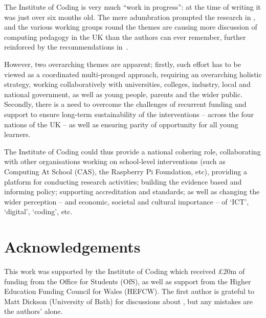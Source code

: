 \documentclass[sigconf,anonymous]{acmart}
\begin{document}
The Institute of Coding is very much ``work in progress'': at the time
of writing it was just over six months old.  The mere adumbration
\cite{HMG2015a} prompted the research in
\cite{murphy-et-al:programming2017}, and the various working groups
round the themes are causing more discussion of computing pedagogy in
the UK than the authors can ever remember, further reinforced by the
recommendations in~\cite{rs:2017}.

However, two overarching themes are apparent; firstly, such effort has
to be viewed as a coordinated multi-pronged approach, requiring an
overarching holistic strategy, working collaboratively with
universities, colleges, industry, local and national government, as
well as young people, parents and the wider public. Secondly, there is
a need to overcome the challenges of recurrent funding and support to
ensure long-term sustainability of the interventions -- across the
four nations of the UK -- as well as ensuring parity of opportunity
for all young learners.

The Institute of Coding could thus provide a national cohering role,
collaborating with other organisations working on school-level
interventions (such as Computing At School (CAS), the Raspberry Pi
Foundation, etc), providing a platform for conducting research
activities; building the evidence based and informing policy;
supporting accreditation and standards; as well as changing the wider
perception -- and economic, societal and cultural importance -- of
`ICT', `digital', `coding', etc.


\section{Acknowledgements}

This work was supported by the Institute of Coding which received
\pounds20m of funding from the Office for Students (OfS), as well as
support from the Higher Education Funding Council for Wales (HEFCW).
The first author is grateful to Matt Dickson (University of Bath) for
discussions about \cite{DfE2018d}, but any mistakes are the authors'
alone.



 
\end{document}
